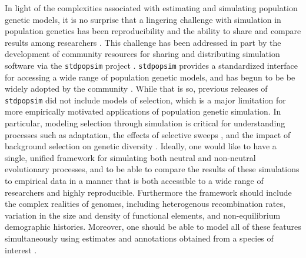 \documentclass[hidelinks]{article}
\newcommand{\stdpopsim}{\texttt{stdpopsim}\xspace}
\begin{document}
    In light of the complexities associated with estimating and simulating
    population genetic models, it is no surprise that
    a lingering challenge with simulation in population genetics has been
    reproducibility and the ability to share and compare results among 
    researchers \citep[e.g.,][]{ragsdale2020lessons}.
    This challenge has been addressed in part by the development
    of community resources for sharing and distributing simulation software
    via the \stdpopsim project \citep{adrion2020community}. \stdpopsim
    provides a standardized interface for accessing a wide range of
    population genetic models, and has begun to be be widely adopted by the community 
    \citep[e.g.,][]{speidel2021inferring, wang2021automatic, yang2022trustgwas, degiorgio2022spatially, browning2023fast, schweiger2023ultrafast, temple2024modeling, haag2025pandora}.
    While that is so, previous releases of \stdpopsim did not include
    models of selection, which is a major limitation for more empirically motivated
    applications of population genetic simulation. In particular, modeling selection
    through simulation is critical for understanding processes such
    as adaptation\citep[e.g.][]{thornton2019polygenic,hartfield2024polygenic}, the effects of selective sweeps 
    \citep[e.g.][]{braverman1995hitchhiking,fay2000hitchhiking,przeworski2002signature,przeworski2005signature,schrider2015soft}, 
    and the impact of background selection on genetic diversity
    \citep[e.g.][]{charlesworth1993effect,charlesworth1995pattern,williamson2002genealogy,ewing2016consequences,torres2020temporal}.
    Ideally, one would like
    to have a single, unified framework for simulating both neutral and
    non-neutral evolutionary processes, and to be able to compare the
    results of these simulations to empirical data in a manner that is
    both accessible to a wide range of researchers and highly reproducible. 
    Furthermore the framework should include the complex realities of 
    genomes, including heterogenous recombination rates, 
    variation in the size and density of functional elements, and
    non-equilibrium demographic histories. Moreover, one should be able
    to model all of these features simultaneously using estimates and annotations obtained
    from a species of interest \citep[e.g.][]{schrider2020background,rodrigues2024shared}.
\end{document}
